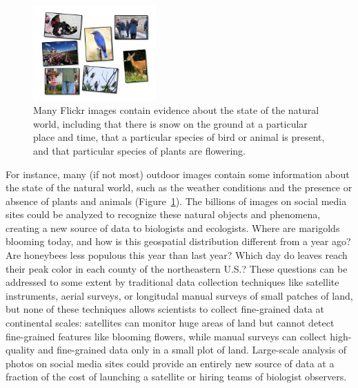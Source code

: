 \begin{figure}[t]
\begin{center}
\includegraphics[width=0.42\textwidth,clip,trim=2cm 1cm 1cm 1cm]{figs/natural-images.pdf}
\end{center}
\caption{Many Flickr images contain evidence about the state of the natural world, including
that there is snow on the ground at a particular place and time, that a particular species of bird or animal is present,
and that particular species of plants are flowering.}
\label{fig:nature}
\vspace{-12pt}
\end{figure}

For instance, many (if not most) outdoor images contain some
information about the state of the natural world, such as the weather
conditions and the presence or absence of plants and animals
(Figure~\ref{fig:nature}).  The billions of images on social media
sites could be analyzed to recognize these natural objects and
phenomena, creating a new source of data to biologists and ecologists.
Where are marigolds blooming
today, and how is this geospatial distribution different from a year
ago? Are honeybees less populous this year than last year? Which day
do leaves reach their peak color in each county of the northeastern
U.S.?  These questions can be addressed to some extent by traditional
data collection techniques like satellite instruments, aerial surveys,
or longitudal manual surveys of small patches of land, but none of
these techniques allows scientists to collect fine-grained data at
continental scales: satellites can monitor huge areas of land but cannot 
detect fine-grained features like blooming flowers, while manual surveys
can collect high-quality and fine-grained data only in a small plot of land.
Large-scale analysis of photos on social media
sites could provide an entirely new source of data at a fraction of the cost
of launching a satellite or hiring teams of biologist observers.

